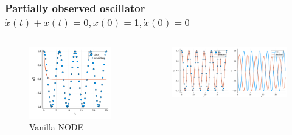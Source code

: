 \documentclass[11pt,aspectratio=169]{beamer}
\begin{document}

\begin{frame}[t]
    \frametitle{Partially observed oscillator $\ddot{x}(t) + x(t) = 0, x(0)=1, \dot{x}(0) = 0$}
    \begin{columns}
        \begin{column}{0.25\textwidth}
            \begin{figure}
                \centering
                \includegraphics[width=\columnwidth]{figures/vanilla_node.png}
                \caption{Vanilla NODE}
            \end{figure}
        \end{column}
        \begin{column}{0.5\textwidth}
            \vspace{-0.3cm}
            \begin{figure}
                \centering
                \includegraphics[width=0.9\columnwidth]{figures/anode_true_init.png}

\end{figure}
\end{column}
\end{columns}
\end{frame}
\end{document}
